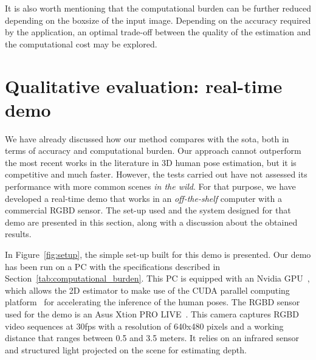 It is also worth mentioning that the computational burden can be further reduced depending on the boxsize of the input image. Depending on the accuracy required by the application, an optimal trade-off between the quality of the estimation and the computational cost may be explored.

\section{Qualitative evaluation: real-time demo}\label{sec:demo}
We have already discussed how our method compares with the \gls{sota}, both in terms of accuracy and computational burden. Our approach cannot outperform the most recent works in the literature in 3D human pose estimation, but it is competitive and much faster. However, the tests carried out have not assessed its performance with more common scenes \emph{in the wild}. For that purpose, we have developed a real-time demo that works in an \emph{off-the-shelf} computer with a commercial RGBD sensor. The set-up used and the system designed for that demo are presented in this section, along with a discussion about the obtained results.

In Figure~\ref{fig:setup}, the simple set-up built for this demo is presented. Our demo has been run on a PC with the specifications described in Section~\ref{tab:computational_burden}. This PC is equipped with an Nvidia GPU~\cite{nvidia}, which allows the 2D estimator to make use of the CUDA parallel computing platform~\cite{nickolls2008scalable} for accelerating the inference of the human poses. The RGBD sensor used for the demo is an Asus Xtion PRO LIVE~\cite{xtion}. This camera captures RGBD video sequences at 30\gls{fps} with a resolution of 640x480 pixels and a working distance that ranges between 0.5 and 3.5 meters. It relies on an infrared sensor and structured light projected on the scene for estimating depth.


